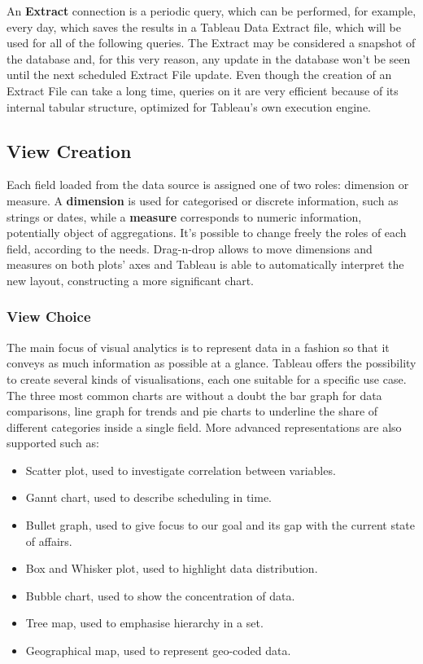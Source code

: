 An \textbf{Extract} connection is a periodic query, which can be performed, for example, every day, which saves the results in a Tableau Data Extract file, which will be used for all of the following queries. The Extract may be considered a snapshot of the database and, for this very reason, any update in the database won't be seen until the next scheduled Extract File update. Even though the creation of an Extract File can take a long time, queries on it are very efficient because of its internal tabular structure, optimized for Tableau's own execution engine.

\subsection{View Creation}

Each field loaded from the data source is assigned one of two roles: dimension or measure. A \textbf{dimension} is used for categorised or discrete information, such as strings or dates, while a \textbf{measure} corresponds to numeric information, potentially object of aggregations. It's possible to change freely the roles of each field, according to the needs. Drag-n-drop allows to move dimensions and measures on both plots' axes and Tableau is able to automatically interpret the new layout, constructing a more significant chart.

\subsubsection{View Choice}
The main focus of visual analytics is to represent data in a fashion so that it conveys as much information as possible at a glance.
Tableau offers the possibility to create several kinds of visualisations, each one suitable for a specific use case. The three most common charts are without a doubt the bar graph for data comparisons, line graph for trends and pie charts to underline the share of different categories inside a single field.
More advanced representations are also supported such as:

\begin{itemize}
	\item Scatter plot, used to investigate correlation between variables.
	\item Gannt chart, used to describe scheduling in time.
	\item Bullet graph, used to give focus to our goal and its gap with the current state of affairs.
	\item Box and Whisker plot, used to highlight data distribution.
	\item Bubble chart, used to show the concentration of data.
	\item Tree map, used to emphasise hierarchy in a set.
	\item Geographical map, used to represent geo-coded data.
\end{itemize} 

